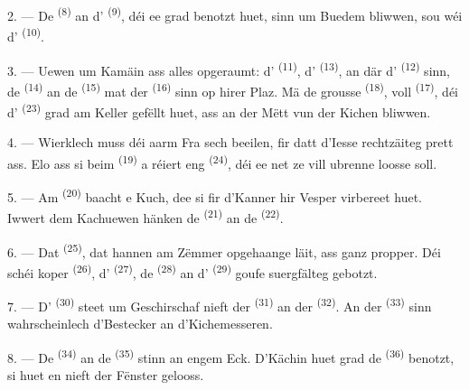 2. --- De  \textsuperscript{(8)} an d'
\textsuperscript{(9)}, déi ee grad benotzt huet, sinn um Buedem bliwwen, sou wéi
d' \textsuperscript{(10)}.

3. --- Uewen um Kamäin ass alles opgeraumt: d'
\textsuperscript{(11)}, d' \textsuperscript{(13)}, an där
d' \textsuperscript{(12)} sinn, de 
\textsuperscript{(14)} an de  \textsuperscript{(15)} mat der
 \textsuperscript{(16)} sinn op hirer Plaz. Mä de grousse
 \textsuperscript{(18)}, voll 
\textsuperscript{(17)}, déi d' \textsuperscript{(23)} grad am Keller
gefëllt huet, ass an der Mëtt vun der Kichen bliwwen.

4. --- Wierklech muss déi aarm Fra sech beeilen, fir datt d'Iesse rechtzäiteg prett
ass. Elo ass si beim  \textsuperscript{(19)} a réiert eng
 \textsuperscript{(24)}, déi ee net ze vill ubrenne loosse soll.

5. --- Am  \textsuperscript{(20)} baacht e Kuch, dee si fir
d'Kanner hir Vesper virbereet huet. Iwwert dem Kachuewen hänken de
 \textsuperscript{(21)} an de 
\textsuperscript{(22)}.

\VUsaut{4.0mm}
\VUsaut{3.0mm}

6. --- Dat  \textsuperscript{(25)}, dat hannen am Zëmmer
opgehaange läit, ass ganz propper. Déi schéi koper 
\textsuperscript{(26)}, d' \textsuperscript{(27)}, de
 \textsuperscript{(28)} an d' \textsuperscript{(29)}
goufe suergfälteg gebotzt.

7. --- D' \textsuperscript{(30)} steet um Geschirschaf nieft der
 \textsuperscript{(31)} an der 
\textsuperscript{(32)}. An der  \textsuperscript{(33)} sinn
wahrscheinlech d'Bestecker an d'Kichemesseren.

8. --- De  \textsuperscript{(34)} an de 
\textsuperscript{(35)} stinn an engem Eck. D'Kächin huet grad de 
\textsuperscript{(36)} benotzt, si huet en nieft der Fënster gelooss.

